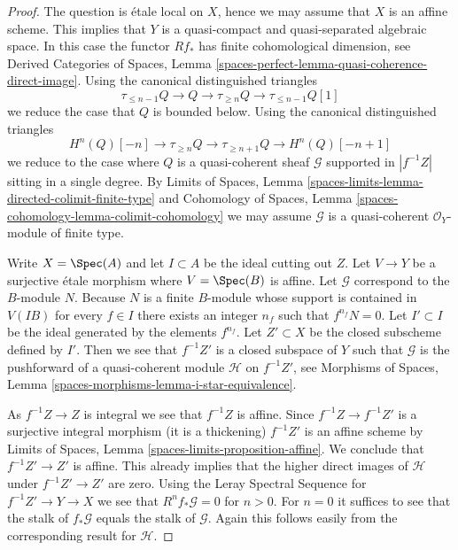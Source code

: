\begin{proof}
The question is \'etale local on $X$, hence we may assume that $X$
is an affine scheme. This implies that $Y$ is a quasi-compact and
quasi-separated algebraic space. In this case the functor $Rf_*$ has
finite cohomological dimension, see
Derived Categories of Spaces, Lemma
\ref{spaces-perfect-lemma-quasi-coherence-direct-image}.
Using the canonical distinguished triangles
$$
\tau_{\leq n - 1}Q \to Q \to \tau_{\geq n}Q \to
\tau_{\leq n - 1}Q[1]
$$
we reduce the case that $Q$ is bounded below. Using the 
canonical distinguished triangles
$$
H^n(Q)[-n] \to \tau_{\geq n}Q \to \tau_{\geq n + 1}Q \to H^n(Q)[-n + 1]
$$
we reduce to the case where $Q$ is a quasi-coherent sheaf $\mathcal{G}$
supported in $|f^{-1}Z|$ sitting in a single degree. By
Limits of Spaces, Lemma
\ref{spaces-limits-lemma-directed-colimit-finite-type}
and
Cohomology of Spaces, Lemma \ref{spaces-cohomology-lemma-colimit-cohomology}
we may assume $\mathcal{G}$ is a quasi-coherent
$\mathcal{O}_Y$-module of finite type.

\medskip\noindent
Write $X = \Spec(A)$ and let $I \subset A$ be the ideal cutting out $Z$.
Let $V \to Y$ be a surjective \'etale morphism where $V = \Spec(B)$
is affine. Let $\mathcal{G}$ correspond to the $B$-module $N$.
Because $N$ is a finite $B$-module whose support is contained
in $V(IB)$ for every $f \in I$ there exists an integer $n_f$ such that
$f^{n_f} N = 0$. Let $I' \subset I$ be the ideal generated by the
elements $f^{n_f}$. Let $Z' \subset X$ be the closed subscheme defined
by $I'$. Then we see that $f^{-1}Z'$ is a closed subspace of $Y$
such that $\mathcal{G}$ is the pushforward of a quasi-coherent
module $\mathcal{H}$ on $f^{-1}Z'$, see Morphisms of Spaces, Lemma
\ref{spaces-morphisms-lemma-i-star-equivalence}.

\medskip\noindent
As $f^{-1}Z \to Z$ is integral we see that $f^{-1}Z$ is affine.
Since $f^{-1}Z \to f^{-1}Z'$ is a surjective integral
morphism (it is a thickening) $f^{-1}Z'$ is an affine scheme by
Limits of Spaces, Lemma \ref{spaces-limits-proposition-affine}.
We conclude that $f^{-1}Z' \to Z'$ is affine. This already implies
that the higher direct images of $\mathcal{H}$ under $f^{-1}Z' \to Z'$
are zero. Using the Leray Spectral Sequence for
$f^{-1}Z' \to Y \to X$ we see that $R^nf_*\mathcal{G} = 0$
for $n > 0$. For $n = 0$ it suffices to see that
the stalk of $f_*\mathcal{G}$ equals the stalk of
$\mathcal{G}$. Again this follows easily from the corresponding
result for $\mathcal{H}$.
\end{proof}

